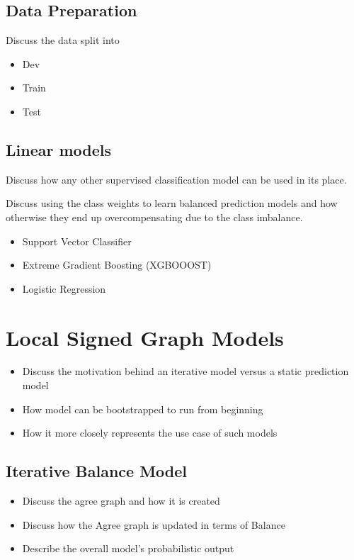 \subsection{Data Preparation}
    Discuss the data split into
    \begin{itemize}
        \item Dev
        \item Train
        \item Test
    \end{itemize}
\subsection{Linear models}
    Discuss how any other supervised classification model can be used in its place.

    Discuss using the class weights to learn balanced prediction models and how otherwise they end up overcompensating due to the class imbalance.
        \begin{itemize}
        \item Support Vector Classifier
        \item Extreme Gradient Boosting (XGBOOOST) 
        \item Logistic Regression
    \end{itemize}

\section{Local Signed Graph Models}
    \begin{itemize}
        \item Discuss the motivation behind an iterative model versus a static prediction model
        \item How model can be bootstrapped to run from beginning
        \item How it more closely represents the use case of such models
    \end{itemize}
    \subsection{Iterative Balance Model}
        \begin{itemize}
            \item Discuss the agree graph and how it is created
            \item Discuss how the Agree graph is updated in terms of Balance
            \item Describe the overall model's probabilistic output
        \end{itemize}
